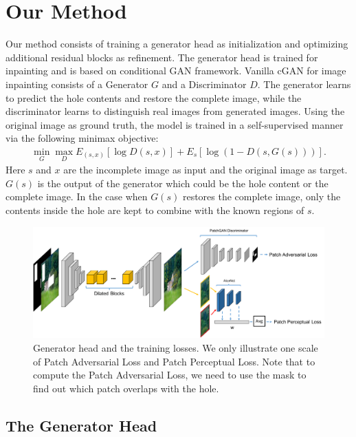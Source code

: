\section{Our Method}

Our method consists of training a generator head as initialization and optimizing additional residual blocks as refinement. The generator head is trained for inpainting and is based on conditional GAN framework. Vanilla cGAN for image inpainting consists of a Generator $G$ and a Discriminator $D$. The generator learns to predict the hole contents and restore the complete image, while the discriminator learns to distinguish real images from generated images. Using the original image as ground truth, the model is trained in a self-supervised manner via the following minimax objective:
\begin{eqnarray}
\min\limits_G \max\limits_D E_{(s,x)}[\log D(s,x)] + E_s[\log (1-D(s,G(s)))].
\end{eqnarray}
Here $s$ and $x$ are the incomplete image as input and the original image as target. $G(s)$ is the output of the generator which could be the hole content or the complete image. In the case when $G(s)$ restores the complete image, only the contents inside the hole are kept to combine with the known regions of $s$.

\begin{figure}[t]
\centering
\small
\includegraphics[width=1\textwidth]{figures/arch2.pdf}
\caption{Generator head and the training losses. We only illustrate one scale of Patch Adversarial Loss and Patch Perceptual Loss. Note that to compute the Patch Adversarial Loss, we need to use the mask to find out which patch overlaps with the hole.}
\label{fig:model}
\vspace{-15pt}
\end{figure}

\subsection{The Generator Head}
\label{sec:resnet_head}

